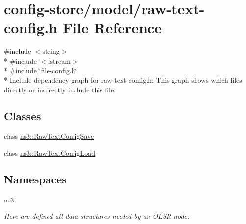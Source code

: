 \hypertarget{raw-text-config_8h}{}\section{config-\/store/model/raw-\/text-\/config.h File Reference}
\label{raw-text-config_8h}
{\ttfamily \#include $<$string$>$}\\*
{\ttfamily \#include $<$fstream$>$}\\*
{\ttfamily \#include \char`\"{}file-\/config.\+h\char`\"{}}\\*
Include dependency graph for raw-\/text-\/config.h\+:
This graph shows which files directly or indirectly include this file\+:
\subsection*{Classes}
\begin{DoxyCompactItemize}
\item 
class \hyperlink{classns3_1_1RawTextConfigSave}{ns3\+::\+Raw\+Text\+Config\+Save}
\item 
class \hyperlink{classns3_1_1RawTextConfigLoad}{ns3\+::\+Raw\+Text\+Config\+Load}
\end{DoxyCompactItemize}
\subsection*{Namespaces}
\begin{DoxyCompactItemize}
\item 
 \hyperlink{namespacens3}{ns3}
\begin{DoxyCompactList}\small\item\em Here are defined all data structures needed by an O\+L\+SR node. \end{DoxyCompactList}\end{DoxyCompactItemize}
